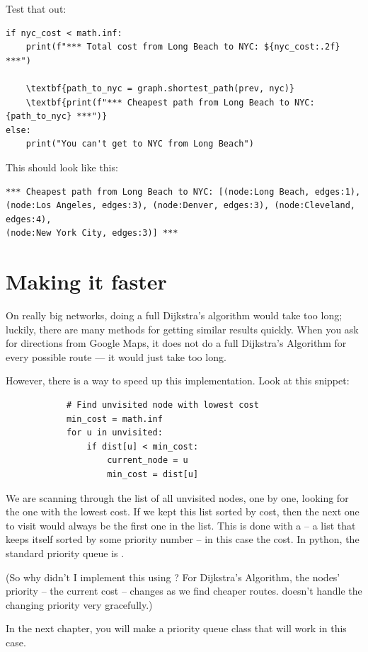 Test that out:

\begin{Verbatim}[commandchars=\\\{\}]
if nyc_cost < math.inf:
    print(f"*** Total cost from Long Beach to NYC: ${nyc_cost:.2f} ***")

    \textbf{path_to_nyc = graph.shortest_path(prev, nyc)}
    \textbf{print(f"*** Cheapest path from Long Beach to NYC: {path_to_nyc} ***")}
else:
    print("You can't get to NYC from Long Beach")
\end{Verbatim}

This should look like this:
\begin{verbatim}
*** Cheapest path from Long Beach to NYC: [(node:Long Beach, edges:1),
(node:Los Angeles, edges:3), (node:Denver, edges:3), (node:Cleveland, edges:4),
(node:New York City, edges:3)] ***
\end{verbatim}

\section{Making it faster}

On really big networks, doing a full Dijkstra's algorithm would take
too long; luckily, there are many methods for getting similar results
quickly.  When you ask for directions from Google Maps, it does not do
a full Dijkstra's Algorithm for every possible route --- it would just
take too long.

However, there is a way to speed up this implementation. Look at this snippet:

\begin{verbatim}
            # Find unvisited node with lowest cost
            min_cost = math.inf
            for u in unvisited:
                if dist[u] < min_cost:
                    current_node = u
                    min_cost = dist[u]
\end{verbatim}

We are scanning through the list of all unvisited nodes, one by one,
looking for the one with the lowest cost.  If we kept this list sorted
by cost, then the next one to visit would always be the first one in
the list. This is done with a  -- a list that
keeps itself sorted by some priority number -- in this case the
cost. In python, the standard priority queue is .

(So why didn't I implement this using ? For Dijkstra's
Algorithm, the nodes' priority -- the current cost --  changes as we find
cheaper routes.  doesn't handle the changing priority
very gracefully.)

In the next chapter, you will make a priority queue class that will
work in this case.
